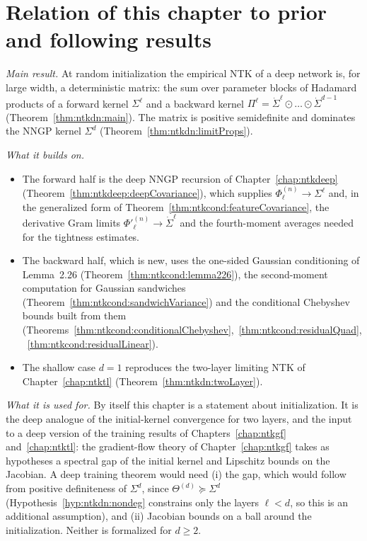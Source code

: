 \section{Relation of this chapter to prior and following results}\label{sec:ntkdn:relation}

\begin{remark}\label{rmk:ntkdn:role}
\emph{Main result.} At random initialization the empirical NTK of a deep network is, for large width, a deterministic matrix: the sum over parameter blocks of Hadamard products of a forward kernel $\Sigma^\ell$ and a backward kernel $\Pi^\ell=\dot\Sigma^\ell\odot\dots\odot\dot\Sigma^{d-1}$ (Theorem~\ref{thm:ntkdn:main}). The matrix is positive semidefinite and dominates the NNGP kernel $\Sigma^d$ (Theorem~\ref{thm:ntkdn:limitProps}).

\emph{What it builds on.}
\begin{itemize}
  \item The forward half is the deep NNGP recursion of Chapter~\ref{chap:ntkdeep} (Theorem~\ref{thm:ntkdeep:deepCovariance}), which supplies $\Phi^{(n)}_\ell\to\Sigma^\ell$ and, in the generalized form of Theorem~\ref{thm:ntkcond:featureCovariance}, the derivative Gram limits $\Phi'^{(n)}_\ell\to\dot\Sigma^\ell$ and the fourth-moment averages needed for the tightness estimates.
  \item The backward half, which is new, uses the one-sided Gaussian conditioning of Lemma~2.26 (Theorem~\ref{thm:ntkcond:lemma226}), the second-moment computation for Gaussian sandwiches (Theorem~\ref{thm:ntkcond:sandwichVariance}) and the conditional Chebyshev bounds built from them (Theorems~\ref{thm:ntkcond:conditionalChebyshev},~\ref{thm:ntkcond:residualQuad},~\ref{thm:ntkcond:residualLinear}).
  \item The shallow case $d=1$ reproduces the two-layer limiting NTK of Chapter~\ref{chap:ntktl} (Theorem~\ref{thm:ntkdn:twoLayer}).
\end{itemize}

\emph{What it is used for.} By itself this chapter is a statement about initialization. It is the deep analogue of the initial-kernel convergence for two layers, and the input to a deep version of the training results of Chapters~\ref{chap:ntkgf} and~\ref{chap:ntktl}: the gradient-flow theory of Chapter~\ref{chap:ntkgf} takes as hypotheses a spectral gap of the initial kernel and Lipschitz bounds on the Jacobian. A deep training theorem would need (i) the gap, which would follow from positive definiteness of $\Sigma^d$, since $\Theta^{(d)}\succeq\Sigma^d$ (Hypothesis~\ref{hyp:ntkdn:nondeg} constrains only the layers $\ell<d$, so this is an additional assumption), and (ii) Jacobian bounds on a ball around the initialization. Neither is formalized for $d\ge2$.
\end{remark}
